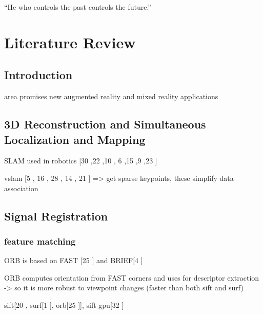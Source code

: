\begin{savequote}[8cm]
  ``He who controls the past controls the future.''
\end{savequote}
\makeatletter
\chapter{Literature Review}

\section{Introduction}

area promises new augmented reality and mixed reality applications

\section{3D Reconstruction and Simultaneous Localization and Mapping}

SLAM used in robotics [30 \cite{Thrun02Robotic},22 \cite{Nuchter056d},10 \cite{Grisetti07Efficient}, 6 \cite{Dellaert06Square},15 \cite{Kaess08Isam},9 \cite{Frese05Multilevel},23 \cite{Olson06Fast}]


vslam [5 \cite{Davison03Real} , 16 \cite{Klein07Parallel}, 28 \cite{Strasdat10Real}, 14 \cite{Jin00Real}, 21 \cite{Nister05Preemptive}] => get sparse keypoints,  
these simplify data association


\section{Signal Registration}

\subsection{feature matching}

ORB is based on FAST [25 \cite{Rosten06Machine}] and BRIEF[4 \cite{Calonder10Brief}]

ORB computes orientation from FAST corners and uses for descriptor extraction -> so it is more robust to viewpoint changes (faster than both sift and surf)

sift[20 \cite{Lowe04Distinctive}, surf[1 \cite{Bay06Surf,Bay08Speeded}], orb[25 \cite{Rublee11Orb}]], sift gpu[32 \cite{Wu07Siftgpu}]

